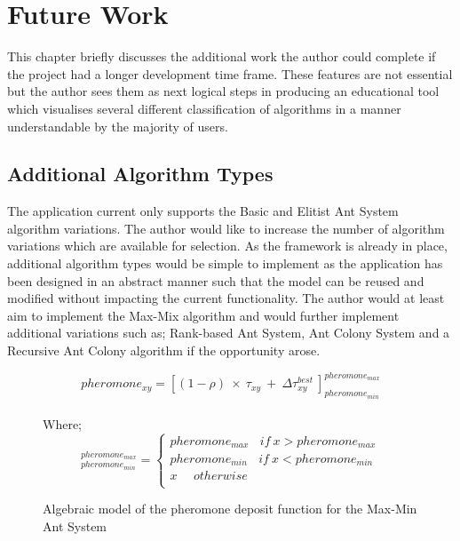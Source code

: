 \chapter{Future Work}
\label{footure}
This chapter briefly discusses the additional work the author could complete if the project had a longer development time frame. These features are not essential but the author sees them as next logical steps in producing an educational tool which visualises several different classification of algorithms in a manner understandable by the majority of users.

\section{Additional Algorithm Types}

The application current only supports the Basic and Elitist Ant System algorithm variations. The author would like to increase the number of algorithm variations which are available for selection. As the framework is already in place, additional algorithm types would be simple to implement as the application has been designed in an abstract manner such that the model can be reused and modified without impacting the current functionality. The author would at least aim to implement the Max-Mix algorithm and would further implement additional variations such as; Rank-based Ant System, Ant Colony System and a Recursive Ant Colony algorithm if the opportunity arose. 

\begin{figure}[H]
\Large
\begin{equation*}
pheromone_{xy} = [(1 - \rho)\ \times\ \tau_{xy}\ +\ \Delta\tau_{xy}^{best}\ ]_{pheromone_{min}}^{pheromone_{max}}
\end{equation*}
\\
Where;
\begin{equation*}
[x]_{pheromone_{min}}^{pheromone_{max}} = \left\{\begin{matrix}
pheromone_{max}\ \ \ \ if\ x > pheromone_{max} \\ 
pheromone_{min}\ \ \ \ if\ x < pheromone_{min} \\ 
x \ \ \ \ \ \ otherwise\\ 
\end{matrix}\right.
\end{equation*}

\caption[Max-Mix Pheromone Function]{Algebraic model of the pheromone deposit function for the Max-Min Ant System \cite{AntColontSite:slides}}
\label{MaxMinSystemPhero}

\end{figure}

